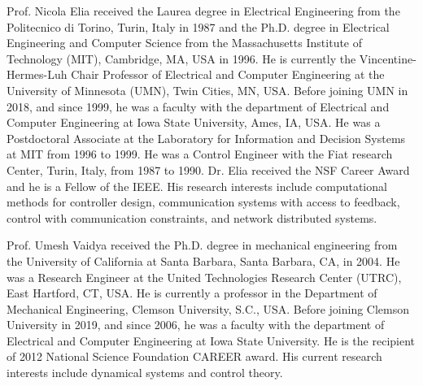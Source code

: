 \documentclass[journal,twoside,web]{ieeecolor}
\begin{document}
\begin{IEEEbiography}
{Prof. Nicola Elia} received the Laurea degree in Electrical Engineering from the Politecnico di Torino, Turin, Italy in 1987 and the Ph.D. degree in Electrical Engineering and Computer Science from the Massachusetts Institute of Technology (MIT), Cambridge, MA, USA in 1996. He is currently the Vincentine-Hermes-Luh Chair Professor of Electrical and Computer Engineering at the University of Minnesota (UMN), Twin Cities, MN, USA. Before joining UMN in 2018, and since 1999, he was a faculty with the department of Electrical and Computer Engineering at Iowa State University, Ames, IA, USA. He was a Postdoctoral Associate at the Laboratory for Information and Decision Systems at MIT from 1996 to 1999. He was a Control Engineer with the Fiat research Center, Turin, Italy, from 1987 to 1990. Dr. Elia received the NSF Career Award and he is a Fellow of the IEEE. His research interests include computational methods for controller design, communication systems with access to feedback, control with communication constraints, and network distributed systems.
\end{IEEEbiography}

\begin{IEEEbiography}
{Prof. Umesh Vaidya} received the Ph.D. degree in mechanical engineering from the University of California at Santa Barbara, Santa Barbara, CA, in
2004. He was a Research Engineer at the United Technologies Research Center (UTRC), East Hartford, CT, USA. He is currently a professor in the Department of Mechanical Engineering, Clemson University, S.C., USA. Before joining Clemson University in 2019, and since 2006, he was a faculty with the department of Electrical and Computer Engineering at Iowa State University. He is the recipient of 2012 National Science Foundation CAREER award. His current research interests include dynamical systems and control theory.
\end{IEEEbiography}

\newpage
\end{document}
